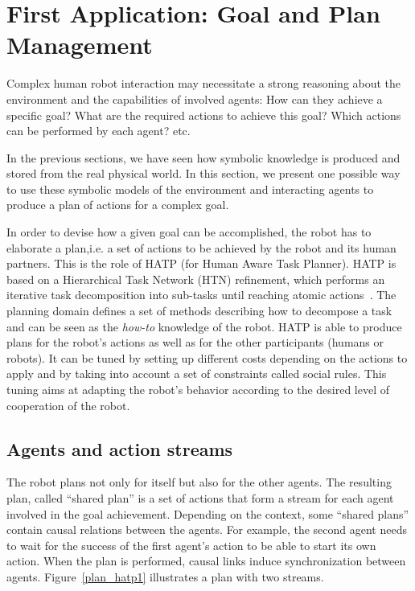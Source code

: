 \documentclass{svmult}
\newcommand{\ie}{i.e.\xspace}
\begin{document}

\section{First Application: Goal and Plan Management}
\label{sec|hatp}

Complex human robot interaction may necessitate a strong reasoning about
the environment and the capabilities of involved agents: How can they
achieve a specific goal? What are the required actions to achieve this
goal? Which actions can be performed by each agent? etc.

In the previous sections, we have seen how symbolic knowledge is produced
and stored from the real physical world. In this section, we present one
possible way to use these symbolic models of the environment and
interacting agents to produce a plan of actions for a complex
goal.

In order to devise how a given goal can be accomplished, the robot has
to elaborate a plan,\ie a set of actions to be achieved by
the robot and its human partners.  This is the role of HATP
\cite{Alili2008} (for Human Aware Task Planner).  HATP is based on a
Hierarchical Task Network (HTN) refinement, which performs an iterative
task decomposition into sub-tasks until reaching atomic
actions~\cite{Nau2003}.  The planning domain defines a set of methods
describing how to decompose a task and can be seen as the {\it how-to}
knowledge of the robot.  HATP is able to produce plans for the robot's
actions as well as for the other participants (humans or robots). It
can be tuned by setting up different costs depending on the actions to
apply and by taking into account a set of constraints called social
rules. This tuning aims at adapting the robot's behavior according to
the desired level of cooperation of the robot.

\subsection*{Agents and action streams}

The robot plans not only for itself but also for the other agents. The
resulting plan, called ``shared plan'' is a set of actions that form
a stream for each agent involved in the goal achievement. Depending on
the context, some ``shared plans'' contain causal relations between the
agents. For example, the second agent needs to wait for the success of
the first agent's action to be able to start its own action. When the
plan is performed, causal links induce synchronization between
agents. Figure~\ref{plan_hatp1} illustrates a plan with two streams.
\end{document}
